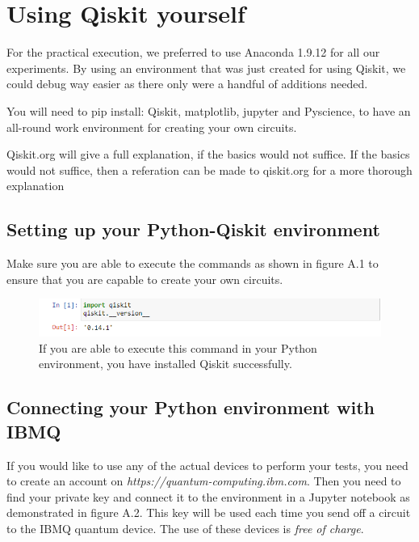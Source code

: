 
\chapter{Using Qiskit yourself}
\label{ch:appendix}

For the practical execution, we preferred to use Anaconda 1.9.12 for all our experiments. By using an environment that was just created for using Qiskit, we could debug way easier as there only were a handful of additions needed.

You will need to pip install: Qiskit, matplotlib, jupyter and Pyscience, to have an all-round work environment for creating your own circuits.

Qiskit.org will give a full explanation, if the basics would not suffice.
If the basics would not suffice, then a referation can be made to qiskit.org for a more thorough explanation


\section{Setting up your Python-Qiskit environment}

Make sure you are able to execute the commands as shown in figure A.1 to ensure that you are capable to create your own circuits.

\begin{figure}
	\centering
	\includegraphics[scale = 0.75]{../Demonstration/img/Qiskit_version.PNG}
	\caption{If you are able to execute this command in your Python environment, you have installed Qiskit successfully.}
\end{figure}

\section{Connecting your Python environment with IBMQ}

If you would like to use any of the actual devices to perform your tests, you need to create an account on \textit{https://quantum-computing.ibm.com}. Then you need to find your private key and connect it to the environment in a Jupyter notebook as demonstrated in figure A.2. This key will be used each time you send off a circuit to the IBMQ quantum device. The use of these devices is \textit{free of charge}.

